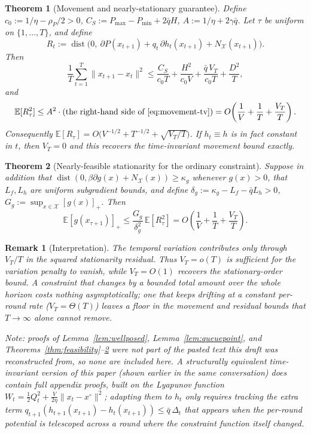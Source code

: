 \documentclass[10pt]{article}
\newtheorem{theorem}{Theorem}
\newtheorem{remark}{Remark}
\newcommand{\E}{\mathbb{E}}
\newcommand{\X}{\mathcal{X}}
\newcommand{\dist}{\mathop{\mathrm{dist}}}
\begin{document}
\begin{theorem}[Movement and nearly-stationary guarantee]
\label{thm:movement}
Define $c_0:=1/\eta-\rho_P/2>0$, $C_S:=P_{\max}-P_{\min}+2\bar qH$,
$A:=1/\eta+2\gamma\bar q$. Let $\tau$ be uniform on $\{1,\ldots,T\}$, and
define
\[
R_t:=\dist\bigl(0,\ \partial P(x_{t+1})+q_t\,\partial h_t(x_{t+1})
+N_{\X}(x_{t+1})\bigr).
\]
Then
\begin{equation}
\frac1T\sum_{t=1}^T\|x_{t+1}-x_t\|^2
\leq
\frac{C_S}{c_0T}+\frac{H^2}{c_0V}+\frac{\bar q\,V_T}{c_0T}+\frac{D^2}{T},
\label{eq:movement-tv}
\end{equation}
and
\begin{equation}
\E[R_\tau^2]\leq A^2\cdot(\text{the right-hand side of \eqref{eq:movement-tv}})
=O\!\left(\frac1V+\frac1T+\frac{V_T}{T}\right).
\label{eq:residual-tv}
\end{equation}
Consequently $\E[R_\tau]=O\bigl(V^{-1/2}+T^{-1/2}+\sqrt{V_T/T}\bigr)$. If
$h_t\equiv h$ is in fact constant in $t$, then $V_T=0$ and this recovers
the time-invariant movement bound exactly.
\end{theorem}

\begin{theorem}[Nearly-feasible stationarity for the ordinary constraint]
\label{thm:gfeas}
Suppose in addition that
$\dist(0,\beta\partial g(x)+N_{\X}(x))\geq\kappa_g$ whenever $g(x)>0$,
that $L_f,L_h$ are uniform subgradient bounds, and define
$\delta_g:=\kappa_g-L_f-\bar qL_h>0$,
$G_g:=\sup_{x\in\X}[g(x)]_+$. Then
\begin{equation}
\E[g(x_{\tau+1})]_+
\leq
\frac{G_g}{\delta_g^2}\,\E[R_\tau^2]
=
O\!\left(\frac1V+\frac1T+\frac{V_T}{T}\right).
\label{eq:gfeas-tv}
\end{equation}
\end{theorem}

\begin{remark}[Interpretation]
The temporal variation contributes only through $V_T/T$ in the squared
stationarity residual. Thus $V_T=o(T)$ is sufficient for the variation
penalty to vanish, while $V_T=O(1)$ recovers the stationary-order bound.
A constraint that changes by a bounded total amount over the whole
horizon costs nothing asymptotically; one that keeps drifting at a
constant per-round rate ($V_T=\Theta(T)$) leaves a floor in the movement
and residual bounds that $T\to\infty$ alone cannot remove.
\end{remark}

\bigskip
\noindent\textit{Note: proofs of Lemma~\ref{lem:wellposed},
Lemma~\ref{lem:queuepoint}, and
Theorems~\ref{thm:feasibility}--\ref{thm:gfeas} were not part of the
pasted text this draft was reconstructed from, so none are included here.
A structurally equivalent time-invariant version of this paper (shown
earlier in the same conversation) does contain full appendix proofs,
built on the Lyapunov function
$W_t=\tfrac12Q_t^2+\tfrac{V}{2\eta}\|x_t-x^{\circ}\|^2$; adapting them to
$h_t$ only requires tracking the extra term
$q_{t+1}(h_{t+1}(x_{t+1})-h_t(x_{t+1}))\le\bar q\,\Delta_t$ that appears
when the per-round potential is telescoped across a round where the
constraint function itself changed.}
\end{document}
